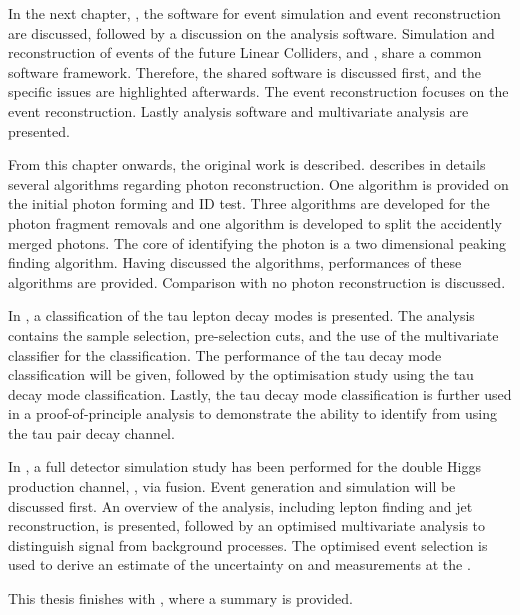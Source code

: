 In the next chapter, , the software for event simulation and event reconstruction  are discussed, followed by a discussion on the analysis software. Simulation and reconstruction of events of the future Linear Colliders, \ILC and \CLIC, share a  common software framework.  Therefore,  the  shared software is discussed first, and the \CLIC specific issues are highlighted afterwards. The event reconstruction focuses on the \pandora event reconstruction. Lastly analysis software and multivariate analysis are presented.

From this chapter onwards, the original work is described.  describes in details several \pandora algorithms regarding photon reconstruction. One algorithm is provided on the initial photon forming and ID test. Three algorithms are developed for the photon fragment removals and one algorithm is developed to split the accidently merged photons. The core of identifying the photon is a two dimensional peaking finding algorithm. Having discussed the algorithms, performances of these algorithms are provided. Comparison with no photon reconstruction is discussed.

In , a classification of the tau lepton decay modes is presented. The analysis contains the sample selection, pre-selection cuts, and the use of the multivariate classifier for the classification.  The performance of the tau decay mode classification will be given, followed by the \ECAL optimisation study using the tau decay mode classification. Lastly, the  tau decay mode classification is further used in a proof-of-principle analysis to demonstrate the ability to identify \PHiggs from \PZ using the tau pair decay channel.


In , a full \CLICILD detector simulation study has been performed for the double Higgs production channel, \eeToHH, via \WW fusion. Event generation and simulation will be discussed first. An overview of the analysis, including lepton finding and jet reconstruction, is presented, followed by an optimised multivariate analysis to distinguish signal from background processes. The optimised event selection is used to derive an estimate of the uncertainty on  \gHHH and \gWWHH measurements at the \CLIC. 

This thesis finishes with , where a summary is provided.